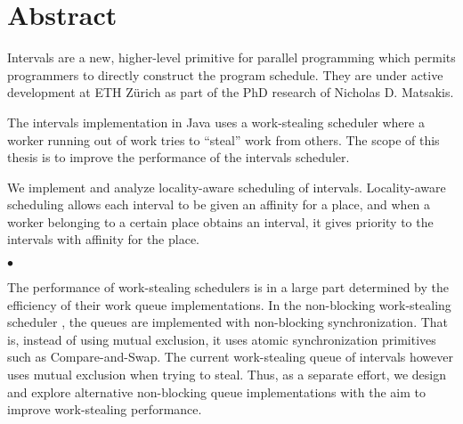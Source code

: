 
\chapter*{Abstract}
\label{chap:abstract}

Intervals are a new, higher-level primitive for parallel programming
which permits programmers to directly construct the program
schedule. They are under active development at ETH Zürich as part of
the PhD research of Nicholas D. Matsakis.

The intervals implementation in Java uses a work-stealing scheduler
where a worker running out of work tries to ``steal'' work from
others. The scope of this thesis is to improve the performance of the
intervals scheduler.

We implement and analyze locality-aware scheduling of
intervals. Locality-aware scheduling allows each interval to be given
an affinity for a place, and when a worker belonging to a certain
place obtains an interval, it gives priority to the intervals with
affinity for the place.

\begin{center}
  $\bullet$
\end{center}

The performance of work-stealing schedulers is in a large part
determined by the efficiency of their work queue implementations. In
the non-blocking work-stealing scheduler \cite{Arora2001}, the queues
are implemented with non-blocking synchronization. That is, instead of
using mutual exclusion, it uses atomic synchronization primitives such
as Compare-and-Swap. The current work-stealing queue of intervals
however uses mutual exclusion when trying to steal. Thus, as a
separate effort, we design and explore alternative non-blocking queue
implementations with the aim to improve work-stealing performance.


